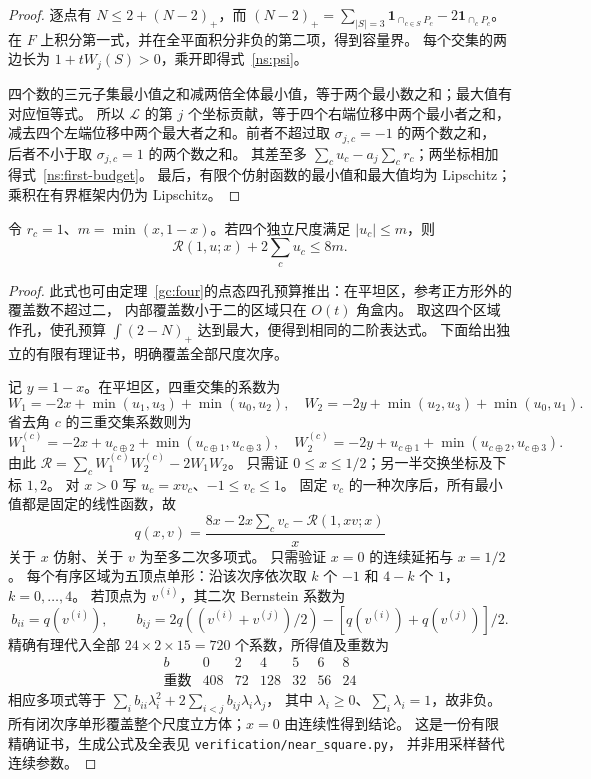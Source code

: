 \begin{proof}
逐点有 $N\le2+(N-2)_+$，而
$(N-2)_+=\sum_{|S|=3}\mathbf1_{\cap_{c\in S}P_c}-2\mathbf1_{\cap_cP_c}$。
在 $F$ 上积分第一式，并在全平面积分非负的第二项，得到容量界。
每个交集的两边长为 $1+tW_j(S)>0$，乘开即得式~\eqref{ns:psi}。

四个数的三元子集最小值之和减两倍全体最小值，等于两个最小数之和；最大值有对应恒等式。
所以 $\mathcal L$ 的第 $j$ 个坐标贡献，等于四个右端位移中两个最小者之和，
减去四个左端位移中两个最大者之和。前者不超过取 $\sigma_{j,c}=-1$ 的两个数之和，
后者不小于取 $\sigma_{j,c}=1$ 的两个数之和。
其差至多 $\sum_cu_c-a_j\sum_cr_c$；两坐标相加得式~\eqref{ns:first-budget}。
最后，有限个仿射函数的最小值和最大值均为 Lipschitz；乘积在有界框架内仍为 Lipschitz。
\end{proof}

\begin{lemma}[平坦参数的二阶预算]\label{ns:flat}
令 $r_c=1$、$m=\min(x,1-x)$。若四个独立尺度满足 $|u_c|\le m$，则
\begin{equation}\label{ns:flat-budget}
 \mathcal R(1,u;x)+2\sum_cu_c\le8m.
\end{equation}
\end{lemma}

\begin{proof}
此式也可由定理~\ref{gc:four}的点态四孔预算推出：在平坦区，参考正方形外的覆盖数不超过二，
内部覆盖数小于二的区域只在 $O(t)$ 角盒内。
取这四个区域作孔，使孔预算 $\int(2-N)_+$ 达到最大，便得到相同的二阶表达式。
下面给出独立的有限有理证书，明确覆盖全部尺度次序。

记 $y=1-x$。在平坦区，四重交集的系数为
\[
 W_1=-2x+\min(u_1,u_3)+\min(u_0,u_2),\quad
 W_2=-2y+\min(u_2,u_3)+\min(u_0,u_1).
\]
省去角 $c$ 的三重交集系数则为
\[
 W_1^{(c)}=-2x+u_{c\oplus2}+\min(u_{c\oplus1},u_{c\oplus3}),\quad
 W_2^{(c)}=-2y+u_{c\oplus1}+\min(u_{c\oplus2},u_{c\oplus3}).
\]
由此 $\mathcal R=\sum_cW_1^{(c)}W_2^{(c)}-2W_1W_2$。
只需证 $0\le x\le1/2$；另一半交换坐标及下标 $1,2$。
对 $x>0$ 写 $u_c=xv_c$、$-1\le v_c\le1$。
固定 $v_c$ 的一种次序后，所有最小值都是固定的线性函数，故
\[
 q(x,v)=\frac{8x-2x\sum_cv_c-\mathcal R(1,xv;x)}x
\]
关于 $x$ 仿射、关于 $v$ 为至多二次多项式。
只需验证 $x=0$ 的连续延拓与 $x=1/2$。
每个有序区域为五顶点单形：沿该次序依次取 $k$ 个 $-1$ 和 $4-k$ 个 $1$，$k=0,\ldots,4$。
若顶点为 $v^{(i)}$，其二次 Bernstein 系数为
\[
 b_{ii}=q(v^{(i)}),\qquad
 b_{ij}=2q((v^{(i)}+v^{(j)})/2)-[q(v^{(i)})+q(v^{(j)})]/2.
\]
精确有理代入全部 $24\times2\times15=720$ 个系数，所得值及重数为
\[
 \begin{array}{c|rrrrrr}
 b&0&2&4&5&6&8\\\hline
 \text{重数}&408&72&128&32&56&24
 \end{array}
\]
相应多项式等于 $\sum_i b_{ii}\lambda_i^2+2\sum_{i<j}b_{ij}\lambda_i\lambda_j$，
其中 $\lambda_i\ge0$、$\sum_i\lambda_i=1$，故非负。
所有闭次序单形覆盖整个尺度立方体；$x=0$ 由连续性得到结论。
这是一份有限精确证书，生成公式及全表见 \texttt{verification/near\_square.py}，
并非用采样替代连续参数。
\end{proof}

